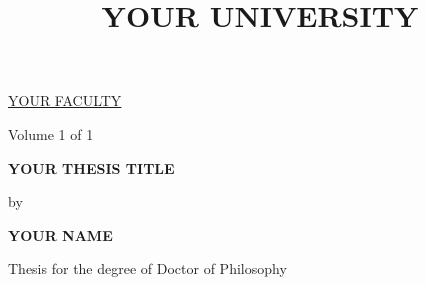 \documentclass[a4paper,11pt]{article} %
\begin{document}
\begin{titlepage}
\begin{center}
\title{YOUR UNIVERSITY}
\large\underline{YOUR FACULTY} 
\par \vspace{0.4in} %
\normalsize{Volume 1 of 1}
\par \vspace{0.4in}
\large{\textbf{YOUR THESIS TITLE}}
\par \vspace{0.2in}
{by}
\par \vspace{0.2in}
\large{\textbf{YOUR NAME}}
\par \vspace{0.4in}
\large{Thesis for the degree of Doctor of Philosophy}
\par \vspace{0.5in}


\end{center}
\end{titlepage}

\newpage\null\thispagestyle{empty}\newpage %
\pagestyle{plain}

\setcounter{secnumdepth}{3} %
\setcounter{tocdepth}{3}  %

\tableofcontents 
\cleardoublepage %
 





\end{document}
